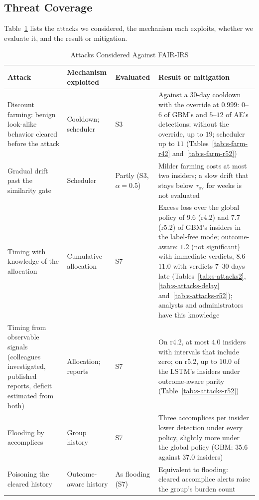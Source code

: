 \documentclass[10pt,onecolumn,letterpaper]{article}
\begin{document}
\subsection{Threat Coverage}
Table~\ref{tab:s-threats} lists the attacks we considered, the mechanism each exploits, whether we evaluate it, and the result or mitigation.

\begin{table}[!t]
\caption{Attacks Considered Against FAIR-IRS\label{tab:s-threats}}
\centering
\footnotesize
\renewcommand{\arraystretch}{1.1}
\begin{tabular}{p{3.6cm}p{3.0cm}p{2.2cm}p{7.6cm}}
\toprule
Attack & Mechanism exploited & Evaluated & Result or mitigation \\
\midrule
Discount farming: benign look-alike behavior cleared before the attack & Cooldown; scheduler & S3 & Against a 30-day cooldown with the override at $0.999$: $0$--$6$ of GBM's and $5$--$12$ of AE's detections; without the override, up to $19$; scheduler up to $11$ (Tables~\ref{tab:s-farm-r42} and~\ref{tab:s-farm-r52}) \\
Gradual drift past the similarity gate & Scheduler & Partly (S3, $\alpha=0.5$) & Milder farming costs at most two insiders; a slow drift that stays below $\tau_{\mathrm{ov}}$ for weeks is not evaluated \\
Timing with knowledge of the allocation & Cumulative allocation & S7 & Excess loss over the global policy of $9.6$ (r4.2) and $7.7$ (r5.2) of GBM's insiders in the label-free mode; outcome-aware: $1.2$ (not significant) with immediate verdicts, $8.6$--$11.0$ with verdicts $7$--$30$ days late (Tables~\ref{tab:s-attacks2}, \ref{tab:s-attacks-delay} and~\ref{tab:s-attacks-r52}); analysts and administrators have this knowledge \\
Timing from observable signals (colleagues investigated, published reports, deficit estimated from both) & Allocation; reports & S7 & On r4.2, at most $4.0$ insiders with intervals that include zero; on r5.2, up to $10.0$ of the LSTM's insiders under outcome-aware parity (Table~\ref{tab:s-attacks-r52}) \\
Flooding by accomplices & Group history & S7 & Three accomplices per insider lower detection under every policy, slightly more under the global policy (GBM: $35.6$ against $37.0$ insiders) \\
Poisoning the cleared history & Outcome-aware history & As flooding (S7) & Equivalent to flooding: cleared accomplice alerts raise the group's burden count \\

\end{tabular}
\end{table}
\end{document}
